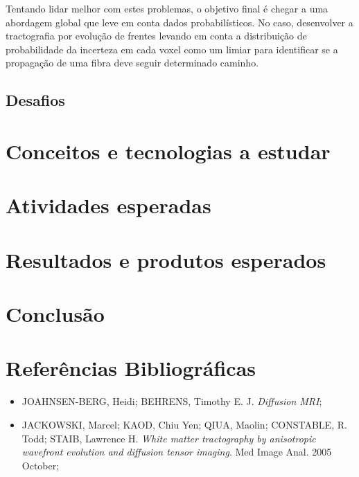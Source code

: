 \documentclass[a4paper,11pt]{report}
\begin{document}
  Tentando lidar melhor com estes problemas, o objetivo final é chegar a uma abordagem global que leve em conta dados probabilísticos. No caso, desenvolver a tractografia por evolução de frentes levando em conta a distribuição de probabilidade da incerteza em cada voxel como um limiar para identificar se a propagação de uma fibra deve seguir determinado caminho.
  
  \section{Desafios}
  
  
\chapter{Conceitos e tecnologias a estudar}

\chapter{Atividades esperadas}

\chapter{Resultados e produtos esperados}

\chapter{Conclusão}

\chapter{Referências Bibliográficas}

\begin{itemize}
  \item JOAHNSEN-BERG, Heidi; BEHRENS, Timothy E. J. \textit{Diffusion MRI};
  \item JACKOWSKI, Marcel; KAOD, Chiu Yen; QIUA, Maolin; CONSTABLE, R. Todd; STAIB, Lawrence H. \textit{White matter tractography by anisotropic wavefront evolution and diffusion tensor imaging}. Med Image Anal. 2005 October;
\end{itemize}
\end{document}
